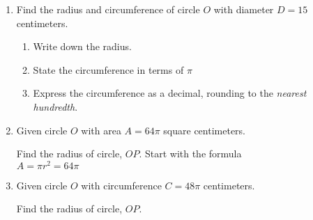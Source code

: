\begin{enumerate}
\item Find the radius and circumference of circle $O$ with diameter $D=15$ centimeters.
  \begin{multicols}{2}
  \raggedcolumns
  \begin{enumerate}
    \item Write down the radius. \vspace{1.2cm}
    \item State the circumference in terms of $\pi$ \vspace{1cm}
    \item Express the circumference as a decimal, rounding to the \emph{nearest hundredth}.
  \end{enumerate}
  \columnbreak
  \end{multicols}

\item Given circle $O$ with area $A=64 \pi$ square centimeters.
  \begin{multicols}{2}
  \raggedcolumns
  Find the radius of circle, $OP$. Start with the formula\\[0.5cm]
  $A = \pi r^2 = 64 \pi$ \vspace{1.7cm}

  \end{multicols}
  
\item Given circle $O$ with circumference $C=48 \pi$ centimeters.
  \begin{multicols}{2}
  \raggedcolumns
  Find the radius of circle, $OP$. \vspace{1.7cm}
  \end{multicols}


\end{enumerate}
